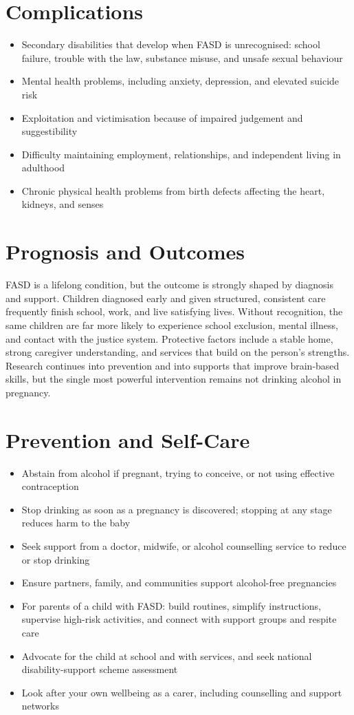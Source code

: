 \section*{Complications}
\begin{itemize}
    \item Secondary disabilities that develop when FASD is unrecognised: school failure, trouble with the law, substance misuse, and unsafe sexual behaviour
    \item Mental health problems, including anxiety, depression, and elevated suicide risk
    \item Exploitation and victimisation because of impaired judgement and suggestibility
    \item Difficulty maintaining employment, relationships, and independent living in adulthood
    \item Chronic physical health problems from birth defects affecting the heart, kidneys, and senses
\end{itemize}

\section*{Prognosis and Outcomes}
FASD is a lifelong condition, but the outcome is strongly shaped by diagnosis and support. Children diagnosed early and given structured, consistent care frequently finish school, work, and live satisfying lives. Without recognition, the same children are far more likely to experience school exclusion, mental illness, and contact with the justice system. Protective factors include a stable home, strong caregiver understanding, and services that build on the person's strengths. Research continues into prevention and into supports that improve brain-based skills, but the single most powerful intervention remains not drinking alcohol in pregnancy.

\section*{Prevention and Self-Care}
\begin{itemize}
    \item Abstain from alcohol if pregnant, trying to conceive, or not using effective contraception
    \item Stop drinking as soon as a pregnancy is discovered; stopping at any stage reduces harm to the baby
    \item Seek support from a doctor, midwife, or alcohol counselling service to reduce or stop drinking
    \item Ensure partners, family, and communities support alcohol-free pregnancies
    \item For parents of a child with FASD: build routines, simplify instructions, supervise high-risk activities, and connect with support groups and respite care
    \item Advocate for the child at school and with services, and seek national disability-support scheme assessment
    \item Look after your own wellbeing as a carer, including counselling and support networks
\end{itemize}

